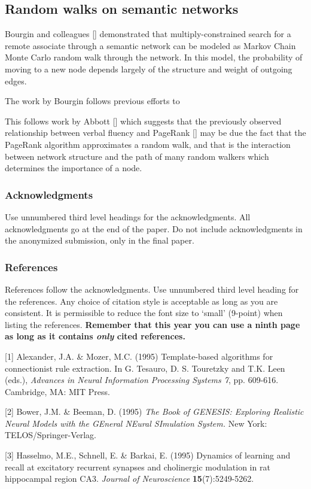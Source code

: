 \documentclass{article} %
\begin{document}
\subsection{Random walks on semantic networks}

Bourgin and colleagues [] demonstrated that multiply-constrained search for a remote associate through a semantic network can be modeled as Markov Chain Monte Carlo random walk through the network. In this model, the probability of moving to a new node depends largely of the structure and weight of outgoing edges. 

The work by Bourgin follows previous efforts to 


This follows work by Abbott [] which suggests that the previously observed relationship between verbal fluency and PageRank [] may be due the fact that the PageRank algorithm approximates a random walk, and that is the interaction between network structure and the path of many random walkers which determines the importance of a node.

\subsubsection*{Acknowledgments}

Use unnumbered third level headings for the acknowledgments. All
acknowledgments go at the end of the paper. Do not include 
acknowledgments in the anonymized submission, only in the 
final paper. 

\subsubsection*{References}

References follow the acknowledgments. Use unnumbered third level heading for
the references. Any choice of citation style is acceptable as long as you are
consistent. It is permissible to reduce the font size to `small' (9-point) 
when listing the references. {\bf Remember that this year you can use
a ninth page as long as it contains \emph{only} cited references.}

\small{
[1] Alexander, J.A. \& Mozer, M.C. (1995) Template-based algorithms
for connectionist rule extraction. In G. Tesauro, D. S. Touretzky
and T.K. Leen (eds.), {\it Advances in Neural Information Processing
Systems 7}, pp. 609-616. Cambridge, MA: MIT Press.

[2] Bower, J.M. \& Beeman, D. (1995) {\it The Book of GENESIS: Exploring
Realistic Neural Models with the GEneral NEural SImulation System.}
New York: TELOS/Springer-Verlag.

[3] Hasselmo, M.E., Schnell, E. \& Barkai, E. (1995) Dynamics of learning
and recall at excitatory recurrent synapses and cholinergic modulation
in rat hippocampal region CA3. {\it Journal of Neuroscience}
{\bf 15}(7):5249-5262.
}
\end{document}
